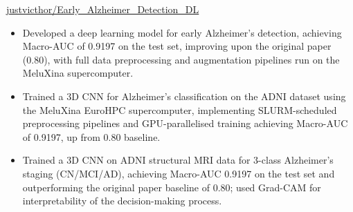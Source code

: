  {}
{
}
{\href{https://github.com/justvicthor/Early_Alzheimer_Detection_DL}
{justvicthor/Early\_Alzheimer\_Detection\_DL}}
\begin{itemize}

\ifde
    \item Developed a deep learning model for early Alzheimer's detection, achieving Macro-AUC of 0.9197 on the test set, improving upon the original paper (0.80), with full data preprocessing and augmentation pipelines run on the MeluXina supercomputer.
\else
    \ifhpc
        \item Trained a 3D CNN for Alzheimer's classification on the ADNI dataset using the MeluXina EuroHPC supercomputer, implementing SLURM-scheduled preprocessing pipelines and GPU-parallelised training achieving Macro-AUC of 0.9197, up from 0.80 baseline.
    \else
        \item Trained a 3D CNN on ADNI structural MRI data for 3-class Alzheimer's staging (CN/MCI/AD), achieving Macro-AUC 0.9197 on the test set and outperforming the original paper baseline of 0.80; used Grad-CAM for interpretability of the decision-making process.
    \fi
\fi

\end{itemize}

\medskip
